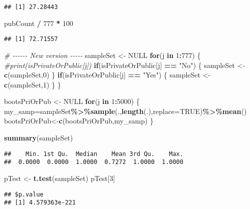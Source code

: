 \documentclass[
]{article}
\newenvironment{Shaded}{\begin{snugshade}}{\end{snugshade}}
\newcommand{\AttributeTok}[1]{\textcolor[rgb]{0.13,0.29,0.53}{#1}}
\newcommand{\CommentTok}[1]{\textcolor[rgb]{0.56,0.35,0.01}{\textit{#1}}}
\newcommand{\ConstantTok}[1]{\textcolor[rgb]{0.56,0.35,0.01}{#1}}
\newcommand{\ControlFlowTok}[1]{\textcolor[rgb]{0.13,0.29,0.53}{\textbf{#1}}}
\newcommand{\DecValTok}[1]{\textcolor[rgb]{0.00,0.00,0.81}{#1}}
\newcommand{\FunctionTok}[1]{\textcolor[rgb]{0.13,0.29,0.53}{\textbf{#1}}}
\newcommand{\NormalTok}[1]{#1}
\newcommand{\OtherTok}[1]{\textcolor[rgb]{0.56,0.35,0.01}{#1}}
\newcommand{\SpecialCharTok}[1]{\textcolor[rgb]{0.81,0.36,0.00}{\textbf{#1}}}
\newcommand{\StringTok}[1]{\textcolor[rgb]{0.31,0.60,0.02}{#1}}
\begin{document}
\begin{verbatim}
## [1] 27.28443
\end{verbatim}

\begin{Shaded}
\begin{Highlighting}[]
\NormalTok{pubCount }\SpecialCharTok{/} \DecValTok{777} \SpecialCharTok{*} \DecValTok{100}
\end{Highlighting}
\end{Shaded}

\begin{verbatim}
## [1] 72.71557
\end{verbatim}

\begin{Shaded}
\begin{Highlighting}[]
\CommentTok{\# {-}{-}{-}{-}{-}{-} New version {-}{-}{-}{-}{-} }
\NormalTok{sampleSet }\OtherTok{\textless{}{-}} \ConstantTok{NULL}
\ControlFlowTok{for}\NormalTok{(j }\ControlFlowTok{in} \DecValTok{1}\SpecialCharTok{:}\DecValTok{777}\NormalTok{)}
\NormalTok{\{}
  \CommentTok{\#print(isPrivateOrPublic[j])}
  \ControlFlowTok{if}\NormalTok{(isPrivateOrPublic[j] }\SpecialCharTok{==} \StringTok{"No"}\NormalTok{)}
\NormalTok{  \{}
\NormalTok{    sampleSet }\OtherTok{\textless{}{-}} \FunctionTok{c}\NormalTok{(sampleSet,}\DecValTok{0}\NormalTok{)}
\NormalTok{  \}}
  \ControlFlowTok{if}\NormalTok{(isPrivateOrPublic[j] }\SpecialCharTok{==} \StringTok{"Yes"}\NormalTok{)}
\NormalTok{  \{}
\NormalTok{    sampleSet }\OtherTok{\textless{}{-}} \FunctionTok{c}\NormalTok{(sampleSet,}\DecValTok{1}\NormalTok{)}
\NormalTok{  \}}
\NormalTok{\}}

\NormalTok{bootsPriOrPub }\OtherTok{\textless{}{-}} \ConstantTok{NULL}
\ControlFlowTok{for}\NormalTok{(j }\ControlFlowTok{in} \DecValTok{1}\SpecialCharTok{:}\DecValTok{5000}\NormalTok{)}
\NormalTok{\{}
\NormalTok{  my\_samp}\OtherTok{=}\NormalTok{sampleSet}\SpecialCharTok{\%\textgreater{}\%}\FunctionTok{sample}\NormalTok{(.,}\FunctionTok{length}\NormalTok{(.),}\AttributeTok{replace=}\ConstantTok{TRUE}\NormalTok{)}\SpecialCharTok{\%\textgreater{}\%}\FunctionTok{mean}\NormalTok{()}
\NormalTok{  bootsPriOrPub}\OtherTok{\textless{}{-}}\FunctionTok{c}\NormalTok{(bootsPriOrPub,my\_samp)}
\NormalTok{\}}

\FunctionTok{summary}\NormalTok{(sampleSet)}
\end{Highlighting}
\end{Shaded}

\begin{verbatim}
##    Min. 1st Qu.  Median    Mean 3rd Qu.    Max. 
##  0.0000  0.0000  1.0000  0.7272  1.0000  1.0000
\end{verbatim}

\begin{Shaded}
\begin{Highlighting}[]
\NormalTok{pTest }\OtherTok{\textless{}{-}} \FunctionTok{t.test}\NormalTok{(sampleSet)}
\NormalTok{pTest[}\DecValTok{3}\NormalTok{]}
\end{Highlighting}
\end{Shaded}

\begin{verbatim}
## $p.value
## [1] 4.579363e-221
\end{verbatim}
\end{document}
